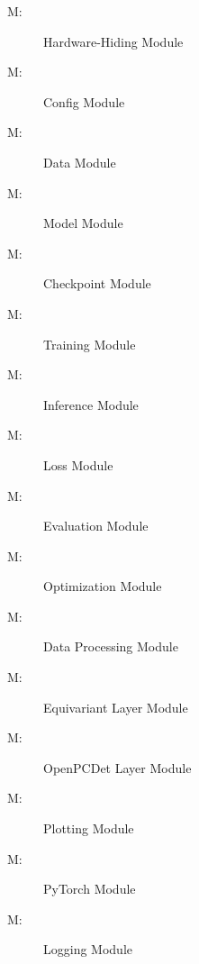 \documentclass[12pt, titlepage]{article}
\newcounter{mnum}
\newcommand{\mthemnum}{M\themnum}
\begin{document}
\begin{description}
\item [ \mthemnum \label{mHH}:] Hardware-Hiding Module
\item [ \mthemnum \label{mCo}:] Config Module
\item [ \mthemnum \label{mD}:] Data Module
\item [ \mthemnum \label{mM}:] Model Module
\item [ \mthemnum \label{mCh}:] Checkpoint Module
\item [ \mthemnum \label{mT}:] Training Module
\item [ \mthemnum \label{mI}:] Inference Module
\item [ \mthemnum \label{mLo}:] Loss Module
\item [ \mthemnum \label{mE}:] Evaluation Module
\item [ \mthemnum \label{mO}:] Optimization Module
\item [ \mthemnum \label{mDP}:] Data Processing Module
\item [ \mthemnum \label{mEL}:] Equivariant Layer Module
\item [ \mthemnum \label{mOL}:] OpenPCDet Layer Module
\item [ \mthemnum \label{mPl}:] Plotting Module
\item [ \mthemnum \label{mPy}:] PyTorch Module
\item [ \mthemnum \label{mLg}:] Logging Module
\end{description}
\end{document}
